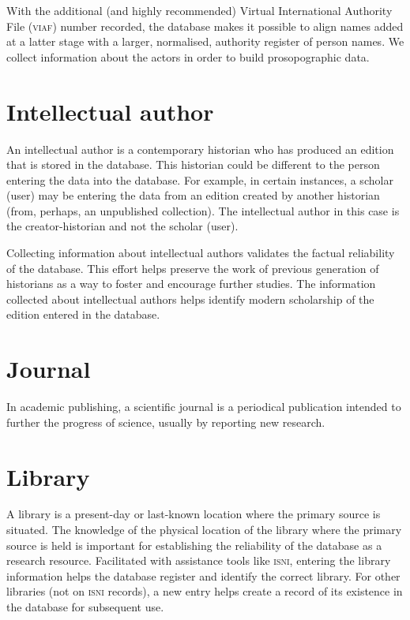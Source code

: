 \documentclass[a4paper,12pt,twoside]{book}
\begin{document}
	With the additional (and highly recommended) Virtual International Authority File (\textsc{viaf}) number recorded, the database makes it possible to align names added at a latter stage with a larger, normalised, authority register of person names. We collect information about the actors in order to build prosopographic data.
	
		\section{Intellectual author}
	An intellectual author is a contemporary historian who has produced an edition that is stored in the database. This historian could be different to the person entering the data into the database. For example, in certain instances, a scholar (user) may be entering the data from an edition created by another historian (from, perhaps, an unpublished collection). The intellectual author in this case is the creator-historian and not the scholar (user).
	
	Collecting information about intellectual authors validates the factual reliability of the database. This effort helps preserve the work of previous generation of historians as a way to foster and encourage further studies. The information collected about intellectual authors helps identify modern scholarship of the edition entered in the database.
	
		\section{Journal}
	In academic publishing, a scientific journal is a periodical publication intended to further the progress of science, usually by reporting new research.
	
		\section{Library}
	A library is a present-day or last-known location where the primary source is situated. The knowledge of the physical location of the library where the primary source is held is important for establishing the reliability of the database as a research resource. Facilitated with assistance tools like \textsc{isni}, entering the library information helps the database register and identify the correct library. For other libraries (not on \textsc{isni} records), a new entry helps create a record of its existence in the database for subsequent use.
	
\end{document}
